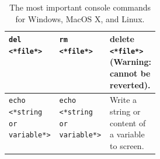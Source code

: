 \documentclass[fsharpnotes.tex]{subfiles}
\begin{document}
\begin{table}
\begin{tabular}{|l|l||p{0.3\linewidth}|}
    {\lstinline[language=syntax]|del <*file*>|}
            & {\lstinline[language=syntax]|rm <*file*>|}
                          & delete {\lstinline[language=syntax]|<*file*>|} (Warning: cannot be reverted). \\ \hline
    {\lstinline[language=syntax, keywords={}]|echo <*string or variable*>|\hspace*{5mm}}
            & {\lstinline[language=syntax, keywords={}]|echo <*string or variable*>|\hspace*{5mm}}
                          & Write a string or content of a variable to screen. \\ \hline
  \end{tabular}\\
  \caption{The most important console commands for Windows, MacOS X, and Linux.}
  \label{tab:Kommandoer}
\end{table}
\end{document}
